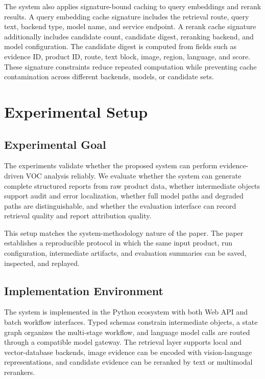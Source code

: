 \documentclass[11pt]{article}
\begin{document}
The system also applies signature-bound caching to query embeddings and rerank results. A query embedding cache signature includes the retrieval route, query text, backend type, model name, and service endpoint. A rerank cache signature additionally includes candidate count, candidate digest, reranking backend, and model configuration. The candidate digest is computed from fields such as evidence ID, product ID, route, text block, image, region, language, and score. These signature constraints reduce repeated computation while preventing cache contamination across different backends, models, or candidate sets.

\section{Experimental Setup}
\subsection{Experimental Goal}

The experiments validate whether the proposed system can perform evidence-driven VOC analysis reliably. We evaluate whether the system can generate complete structured reports from raw product data, whether intermediate objects support audit and error localization, whether full model paths and degraded paths are distinguishable, and whether the evaluation interface can record retrieval quality and report attribution quality.

This setup matches the system-methodology nature of the paper. The paper establishes a reproducible protocol in which the same input product, run configuration, intermediate artifacts, and evaluation summaries can be saved, inspected, and replayed.

\subsection{Implementation Environment}

The system is implemented in the Python ecosystem with both Web API and batch workflow interfaces. Typed schemas constrain intermediate objects, a state graph organizes the multi-stage workflow, and language model calls are routed through a compatible model gateway. The retrieval layer supports local and vector-database backends, image evidence can be encoded with vision-language representations, and candidate evidence can be reranked by text or multimodal rerankers.
\end{document}
